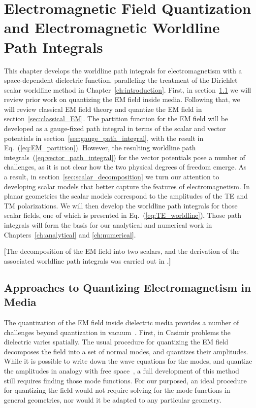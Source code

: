 \chapter{Electromagnetic Field Quantization and Electromagnetic Worldline Path Integrals}

\label{ch:EM_quantization}

This chapter develops the worldline path integrals for electromagnetism with a space-dependent
dielectric function, paralleling the treatment of the Dirichlet scalar worldline method in Chapter~\ref{ch:introduction}.  
First, in section~\ref{sec:quantizing} we will review prior work on quantizing the EM field inside media.
Following that, we will review classical EM field theory and quantize the EM field in section~\ref{sec:classical_EM}.
The partition function for the EM field will be developed as a gauge-fixed path integral in terms of the scalar and vector potentials
in section~\ref{sec:gauge_path_integral}, with the result in Eq.~(\ref{eq:EM_partition}).
However, the resulting worldline path integrals~(\ref{eq:vector_path_integral}) for the vector potentials pose a number of challenges, as 
it is not clear how the two physical degrees of freedom emerge. 
As a result, in section~\ref{sec:scalar_decomposition} we turn our attention to developing scalar models that better capture the features
of electromagnetism.
In planar geometries the scalar models correspond to the amplitudes of the TE and TM polarizations.  
We will then develop the worldline path integrals for those scalar fields, one of which is presented in
Eq.~(\ref{eq:TE_worldline}).  Those path integrals will form
the basis for our analytical and numerical work in Chapters~\ref{ch:analytical} and \ref{ch:numerical}.  

[The decomposition of the EM field into two scalars, and the derivation of the associated 
worldline path integrals was carried out in \citet{Mackrory2016}.]

\section{Approaches to Quantizing Electromagnetism in Media}
\label{sec:quantizing}
The quantization of the EM field inside dielectric media provides a number of challenges 
beyond quantization in vacuum~\citep{Huttner1992,Dung1998,Bechler1999,Bordag1998,Rahi2009,Reid2013}.  
 First, in Casimir problems the dielectric varies spatially.  The usual procedure for
quantizing the EM field decomposes the field into a set of normal modes, and quantizes their amplitudes.
  While it is possible to write down the wave equations for the modes, and quantize the amplitudes
 in analogy with free space~\citep{Glauber1991}, a full development of this method still requires finding those mode functions.
For our purposed, an ideal procedure for quantizing the field would not require solving for the mode functions in
general geometries, nor would it be adapted to any particular geometry.   

